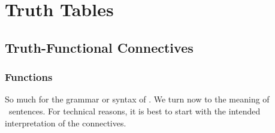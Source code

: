 \part{Truth Tables}
\label{ch.TruthTables}



\chapter{Truth-Functional Connectives}\label{s:TruthFunctionality}

\section{Functions}\label{ss.function}

So much for the grammar or syntax of \TFL. We turn now to the meaning of \TFL\ sentences. For technical reasons, it is best to  start with the intended interpretation of the connectives. 

